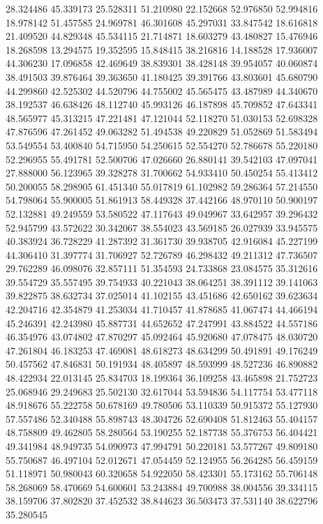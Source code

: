 28.324486
45.339173
25.528311
51.210980
22.152668
52.976850
52.994816
18.978142
51.457585
24.969781
46.301608
45.297031
33.847542
18.616818
21.409520
44.829348
45.534115
21.714871
18.603279
43.480827
15.476946
18.268598
13.294575
19.352595
15.848415
38.216816
14.188528
17.936007
44.306230
17.096858
42.469649
38.839301
38.428148
39.954057
40.060874
38.491503
39.876464
39.363650
41.180425
39.391766
43.803601
45.680790
44.299860
42.525302
44.520796
44.755002
45.565475
43.487989
44.340670
38.192537
46.638426
48.112740
45.993126
46.187898
45.709852
47.643341
48.565977
45.313215
47.221481
47.121044
52.118270
51.030153
52.698328
47.876596
47.261452
49.063282
51.494538
49.220829
51.052869
51.583494
53.549554
53.400840
54.715950
54.250615
52.554270
52.786678
55.220180
52.296955
55.491781
52.500706
47.026660
26.880141
39.542103
47.097041
27.888000
56.123965
39.328278
31.700662
54.933410
50.450254
55.413412
50.200055
58.298905
61.451340
55.017819
61.102982
59.286364
57.214550
54.798064
55.900005
51.861913
58.449328
37.442166
48.970110
50.900197
52.132881
49.249559
53.580522
47.117643
49.049967
33.642957
39.296432
52.945799
43.572622
30.342067
38.554023
43.569185
26.027939
33.945575
40.383924
36.728229
41.287392
31.361730
39.938705
42.916084
45.227199
44.306410
31.397774
31.706927
52.726789
46.298432
49.211312
47.736507
29.762289
46.098076
32.857111
51.354593
24.733868
23.084575
35.312616
39.554729
35.557495
39.754933
40.221043
38.064251
38.391112
39.141063
39.822875
38.632734
37.025014
41.102155
43.451686
42.650162
39.623634
42.204716
42.354879
41.253034
41.710457
41.878685
41.067474
44.466194
45.246391
42.243980
45.887731
44.652652
47.247991
43.884522
44.557186
46.354976
43.074802
47.870297
45.092464
45.920680
47.078475
48.030720
47.261804
46.183253
47.469081
48.618273
48.634299
50.491891
49.176249
50.457562
47.846831
50.191934
48.405897
48.593999
48.527236
46.890882
48.422934
22.013145
25.834703
18.199364
36.109258
43.465898
21.752723
25.068946
29.249683
25.502130
32.617044
53.594836
54.117754
53.477118
48.918676
55.222758
50.678169
49.780506
53.110339
50.915372
55.127930
57.557486
52.340488
55.898743
48.304726
52.690408
51.812463
55.404157
48.758809
49.462805
58.280564
53.190255
52.187738
55.376753
56.404421
49.341984
48.949735
54.090973
47.994791
50.220181
53.577267
49.809180
55.750687
46.497104
52.012671
47.054459
52.124955
56.264285
56.459159
51.118971
50.980043
60.320658
54.922050
58.423301
55.173162
55.706148
58.268069
58.470669
54.600601
53.243884
49.700988
38.004556
39.334115
38.159706
37.802820
37.452532
38.844623
36.503473
37.531140
38.622796
35.280545
